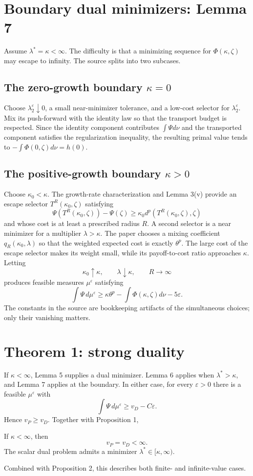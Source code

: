 \section{Boundary dual minimizers: Lemma 7}
Assume \(\lambda^*=\kappa<\infty\).  The difficulty is that a minimizing sequence for
\(\Phi(\kappa,\zeta)\) may escape to infinity.  The source splits into two subcases.

\subsection{The zero-growth boundary \(\kappa=0\)}
Choose \(\lambda_2^\varepsilon\downarrow0\), a small near-minimizer tolerance, and a low-cost
selector for \(\lambda_2^\varepsilon\).  Mix its push-forward with the identity law so that the
transport budget is respected.  Since the identity component contributes \(\int\Psi d\nu\) and the
transported component satisfies the regularization inequality, the resulting primal value tends to
\(-\int\Phi(0,\zeta)d\nu=h(0)\).

\subsection{The positive-growth boundary \(\kappa>0\)}
Choose \(\kappa_0<\kappa\).  The growth-rate characterization and Lemma 3(v) provide an escape
selector \(T^R(\kappa_0,\zeta)\) satisfying
\[
 \Psi(T^R(\kappa_0,\zeta))-\Psi(\zeta)
 \ge \kappa_0d^p(T^R(\kappa_0,\zeta),\zeta)
\]
and whose cost is at least a prescribed radius \(R\).  A second selector is a near minimizer for a
multiplier \(\lambda>\kappa\).  The paper chooses a mixing coefficient
\(q_R(\kappa_0,\lambda)\) so that the weighted expected cost is exactly \(\theta^p\).  The large
cost of the escape selector makes its weight small, while its payoff-to-cost ratio approaches
\(\kappa\).  Letting
\[
 \kappa_0\uparrow\kappa,
 \qquad \lambda\downarrow\kappa,
 \qquad R\to\infty
\]
produces feasible measures \(\mu^\varepsilon\) satisfying
\begin{equation}\label{eq:gk-boundary-eps}
 \int\Psi\,d\mu^\varepsilon
 \ge \kappa\theta^p-
       \int\Phi(\kappa,\zeta)d\nu-5\varepsilon.
\end{equation}
The constants in the source are bookkeeping artifacts of the simultaneous choices; only their
vanishing matters.

\section{Theorem 1: strong duality}
If \(\kappa<\infty\), Lemma 5 supplies a dual minimizer.  Lemma 6 applies when
\(\lambda^*>\kappa\), and Lemma 7 applies at the boundary.  In either case, for every
\(\varepsilon>0\) there is a feasible \(\mu^\varepsilon\) with
\[
 \int\Psi\,d\mu^\varepsilon\ge v_D-C\varepsilon.
\]
Hence \(v_P\ge v_D\).  Together with Proposition 1,
\begin{theorem}
If \(\kappa<\infty\), then
\[
 v_P=v_D<\infty.
\]
The scalar dual problem admits a minimizer \(\lambda^*\in[\kappa,\infty)\).
\end{theorem}
Combined with Proposition 2, this describes both finite- and infinite-value cases.

